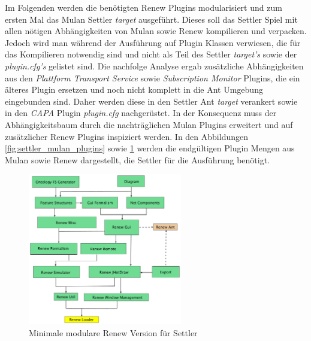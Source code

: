 	Im Folgenden werden die benötigten Renew Plugins modularisiert und zum ersten Mal das Mulan Settler \textit{target} ausgeführt. Dieses soll das Settler Spiel mit allen nötigen Abhängigkeiten von Mulan sowie Renew kompilieren und verpacken. Jedoch wird man während der Ausführung auf Plugin Klassen verwiesen, die für das Kompilieren notwendig sind und nicht als Teil des Settler \textit{target's} sowie der \textit{plugin.cfg's} gelistet sind. \newline
	Die nachfolge Analyse ergab zusätzliche Abhängigkeiten aus den \textit{Plattform Transport Service} sowie \textit{Subscription Monitor} Plugins, die ein älteres Plugin ersetzen und noch nicht komplett in die Ant Umgebung eingebunden sind. Daher werden diese in den Settler Ant \textit{target} verankert sowie in den \textit{CAPA} Plugin \textit{plugin.cfg} nachgerüstet. In der Konsequenz muss der Abhängigkeitsbaum durch die nachträglichen Mulan Plugins erweitert und auf zusätzlicher Renew Plugins inspiziert werden. \newline
	In den Abbildungen \ref{fig:settler_mulan_plugins} sowie \ref{fig:renew_mulan_plugins} werden die endgültigen Plugin Mengen aus Mulan sowie Renew dargestellt, die Settler für die Ausführung benötigt. \bigbreak

	\begin{figure}[h!]
	  \centering
	  \includegraphics[width=0.6\textwidth]{material/images/settler-renew-tree-extend.pdf}
	  \caption{Minimale modulare Renew Version für Settler}
	  \label{fig:renew_mulan_plugins}
	\end{figure}	

